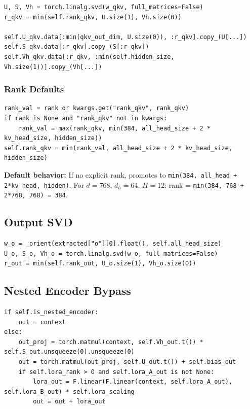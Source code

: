 \begin{lstlisting}
U, S, Vh = torch.linalg.svd(w_qkv, full_matrices=False)
r_qkv = min(self.rank_qkv, U.size(1), Vh.size(0))

self.U_qkv.data[:min(qkv_out_dim, U.size(0)), :r_qkv].copy_(U[...])
self.S_qkv.data[:r_qkv].copy_(S[:r_qkv])
self.Vh_qkv.data[:r_qkv, :min(self.hidden_size, Vh.size(1))].copy_(Vh[...])
\end{lstlisting}

\subsubsection{Rank Defaults}

\begin{lstlisting}
rank_val = rank or kwargs.get("rank_qkv", rank_qkv)
if rank is None and "rank_qkv" not in kwargs:
    rank_val = max(rank_qkv, min(384, all_head_size + 2 * kv_head_size, hidden_size))
self.rank_qkv = min(rank_val, all_head_size + 2 * kv_head_size, hidden_size)
\end{lstlisting}

\textbf{Default behavior:} If no explicit rank, promotes to \texttt{min(384, all\_head + 2*kv\_head, hidden)}. 
For $d = 768$, $d_h = 64$, $H = 12$: rank = \texttt{min(384, 768 + 2*768, 768) = 384}.

\subsection{Output SVD}

\begin{lstlisting}
w_o = _orient(extracted["o"][0].float(), self.all_head_size)
U_o, S_o, Vh_o = torch.linalg.svd(w_o, full_matrices=False)
r_out = min(self.rank_out, U_o.size(1), Vh_o.size(0))
\end{lstlisting}

\subsection{Nested Encoder Bypass}

\begin{lstlisting}
if self.is_nested_encoder:
    out = context
else:
    out_proj = torch.matmul(context, self.Vh_out.t()) * self.S_out.unsqueeze(0).unsqueeze(0)
    out = torch.matmul(out_proj, self.U_out.t()) + self.bias_out
    if self.lora_rank > 0 and self.lora_A_out is not None:
        lora_out = F.linear(F.linear(context, self.lora_A_out), self.lora_B_out) * self.lora_scaling
        out = out + lora_out
\end{lstlisting}

